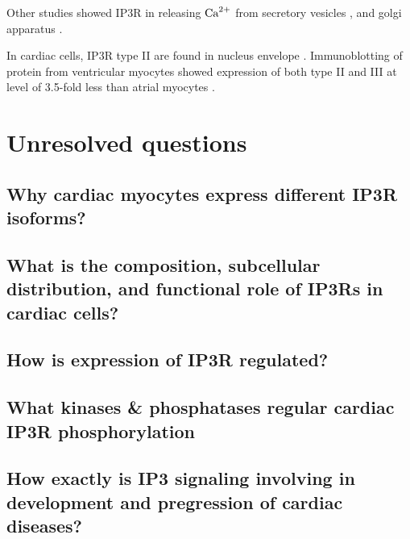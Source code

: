 Other studies showed IP3R in releasing ${\text{Ca}^{2+}}$ from secretory vesicles
\citep{yule1997}, and golgi apparatus \citep{pinton1998}.

In cardiac cells, IP3R type II are found in nucleus envelope
\citep{janowski2010,bare2005}. Immunoblotting of protein from ventricular
myocytes showed expression of both type II and III at level of 3.5-fold less
than atrial myocytes \citep{domeier2008}.



\section{Unresolved questions}
\label{sec:unresolved-questions}

\subsection[Q1]{Why cardiac myocytes express different IP3R isoforms?}
\label{sec:why-cardiac-myocytes}


\subsection[Q2]{What is the composition, subcellular distribution, and functional role of IP3Rs in cardiac cells?}
\label{sec:what-comp-subc}




\subsection[Q3]{How is expression of IP3R regulated?}
\label{sec:how-expression-ip3r}


\subsection[Q4]{What kinases \& phosphatases regular cardiac IP3R phosphorylation}
\label{sec:what-kinases-}


\subsection[Q5]{How exactly is IP3 signaling involving in development and pregression of cardiac diseases?}
\label{sec:how-exactly-ip3}


